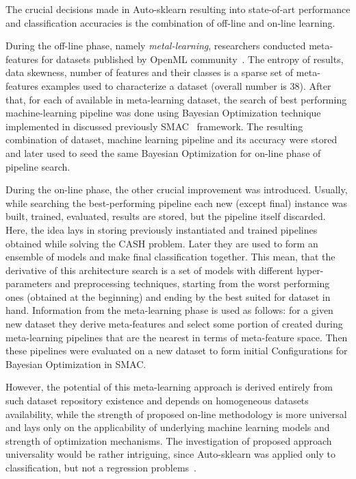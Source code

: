 The crucial decisions made in Auto-sklearn resulting into state-of-art performance and classification accuracies is the combination of off-line and on-line learning.

During the off-line phase, namely \textit{metal-learning}, researchers conducted meta-features for datasets published by OpenML community~\cite{OpenMLPython2019}. 
The entropy of results, data skewness, number of features and their classes is a sparse set of meta-features examples used to characterize a dataset (overall number is 38). After that, for each of available in meta-learning dataset, the search of best performing machine-learning pipeline was done using Bayesian Optimization technique implemented in discussed previously SMAC~\cite{hutter2011sequential} framework. The resulting combination of dataset, machine learning pipeline and its accuracy were stored and later used to seed the same Bayesian Optimization for on-line phase of pipeline search. 

During the on-line phase, the other crucial improvement was introduced. Usually, while searching the best-performing pipeline each new (except final) instance was built, trained, evaluated, results are stored, but the pipeline itself discarded. Here, the idea lays in storing previously instantiated and trained pipelines obtained while solving the CASH problem. Later they are used to form an ensemble of models and make final classification together. This mean, that the derivative of this architecture search is a set of models with different hyper-parameters and preprocessing techniques, starting from the worst performing ones (obtained at the beginning) and ending by the best suited for dataset in hand. 
Information from the meta-learning phase is used as follows: for a given new dataset they derive meta-features and select some portion of created during meta-learning pipelines that are the nearest in terms of meta-feature space. Then these pipelines were evaluated on a new dataset to form initial Configurations for Bayesian Optimization in SMAC.

However, the potential of this meta-learning approach is derived entirely from such dataset repository existence and depends on homogeneous datasets availability, while the strength of proposed on-line methodology is more universal and lays only on the applicability of underlying machine learning models and strength of optimization mechanisms.
The investigation of proposed approach universality would be rather intriguing, since Auto-sklearn was applied only to classification, but not a regression problems~\cite{feurer2015efficient,biedenkapp-ecai20}.




